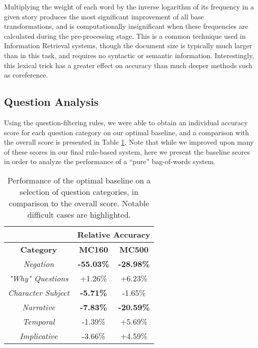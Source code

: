 \documentclass[11pt]{article}
\begin{document}
Multiplying the weight of each word by the inverse logarithm of its frequency in a given story produces the most significant improvement of all base transformations, and is computationally insignificant when these frequencies are calculated during the pre-processing stage. This is a common technique used in Information Retrieval systems, though the document size is typically much larger than in this task, and requires no syntactic or semantic information. Interestingly, this lexical trick has a greater effect on accuracy than much deeper methods such as coreference.

\subsection{Question Analysis}

Using the question-filtering rules, we were able to obtain an individual accuracy score for each question category on our optimal baseline, and a comparison with the overall score is presented in Table \ref{table:catres}. Note that while we improved upon many of these scores in our final rule-based system, here we present the baseline scores in order to analyze the performance of a ``pure'' bag-of-words system.

\begin{table}[!th]
\centering
\begin{tabular}{c|c|c|}
\cline{2-3}
                                                 & \multicolumn{2}{|c|}{\textbf{Relative Accuracy}} \\ \hline
\multicolumn{1}{|c|}{\textbf{Category}} & \textbf{MC160}                 & \textbf{MC500}                \\ \hline
\multicolumn{1}{|c|}{\textit{Negation}}          & \textbf{-55.03\%}          & \textbf{-28.98\%}         \\ \hline
\multicolumn{1}{|c|}{\textit{"Why" Questions}}   & +1.26\%                    & +6.23\%                   \\ \hline
\multicolumn{1}{|c|}{\textit{Character Subject}}   & \textbf{-5.71\%}           & -1.65\%                   \\ \hline
\multicolumn{1}{|c|}{\textit{Narrative}}         & \textbf{-7.83\%}           & \textbf{-20.59\%}         \\ \hline
\multicolumn{1}{|c|}{\textit{Temporal}}          & -1.39\%                    & +5.69\%                   \\ \hline
\multicolumn{1}{|c|}{\textit{Implicative}}       & -3.66\%                    & +4.59\%                   \\ \hline
\end{tabular}
\caption{Performance of the optimal baseline on a selection of question categories, in comparison to the overall score. Notable difficult cases are highlighted.}
\label{table:catres}
\end{table}
\end{document}
